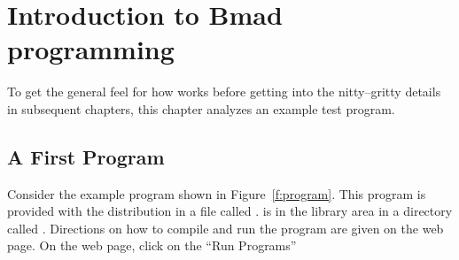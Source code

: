 \chapter{Introduction to Bmad programming}
\label{c:program.info}

To get the general feel for how \bmad works before
getting into the nitty--gritty details in subsequent chapters, this
chapter analyzes an example test program.

\section{A First Program}
\label{s:first.program}

Consider the example program shown in Figure~\ref{f:program}.  This
program is provided with the \bmad distribution in a file called
.  is in the library
area in a directory called . Directions on
how to compile and run the program are given on the \bmad web
page\cite{b:bmad.web}. On the \bmad web page, click on the ``Run Programs''

